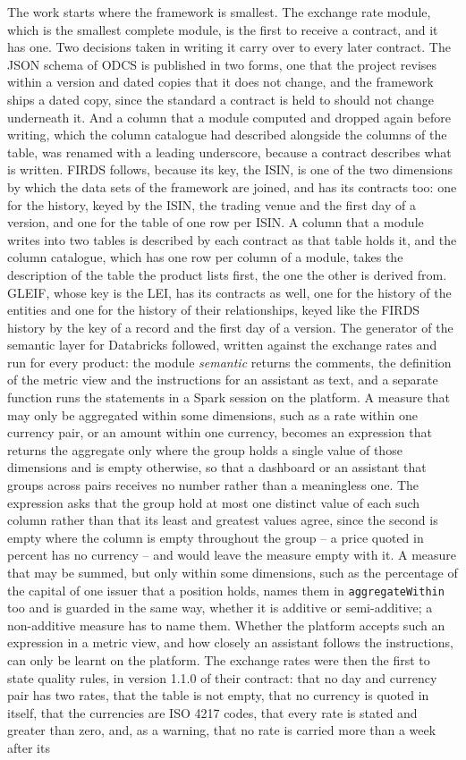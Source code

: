 \documentclass[a4paper, 11pt]{report}
\begin{document}
The work starts where the framework is smallest. The exchange rate module, which is the smallest complete module, is the first to receive a contract, and it has one. Two decisions taken in writing it carry over to every later contract. The JSON schema of ODCS is published in two forms, one that the project revises within a version and dated copies that it does not change, and the framework ships a dated copy, since the standard a contract is held to should not change underneath it. And a column that a module computed and dropped again before writing, which the column catalogue had described alongside the columns of the table, was renamed with a leading underscore, because a contract describes what is written. FIRDS follows, because its key, the ISIN, is one of the two dimensions by which the data sets of the framework are joined, and has its contracts too: one for the history, keyed by the ISIN, the trading venue and the first day of a version, and one for the table of one row per ISIN. A column that a module writes into two tables is described by each contract as that table holds it, and the column catalogue, which has one row per column of a module, takes the description of the table the product lists first, the one the other is derived from. GLEIF, whose key is the LEI, has its contracts as well, one for the history of the entities and one for the history of their relationships, keyed like the FIRDS history by the key of a record and the first day of a version. The generator of the semantic layer for Databricks followed, written against the exchange rates and run for every product: the module \emph{semantic} returns the comments, the definition of the metric view and the instructions for an assistant as text, and a separate function runs the statements in a Spark session on the platform. A measure that may only be aggregated within some dimensions, such as a rate within one currency pair, or an amount within one currency, becomes an expression that returns the aggregate only where the group holds a single value of those dimensions and is empty otherwise, so that a dashboard or an assistant that groups across pairs receives no number rather than a meaningless one. The expression asks that the group hold at most one distinct value of each such column rather than that its least and greatest values agree, since the second is empty where the column is empty throughout the group -- a price quoted in percent has no currency -- and would leave the measure empty with it. A measure that may be summed, but only within some dimensions, such as the percentage of the capital of one issuer that a position holds, names them in \verb|aggregateWithin| too and is guarded in the same way, whether it is additive or semi-additive; a non-additive measure has to name them. Whether the platform accepts such an expression in a metric view, and how closely an assistant follows the instructions, can only be learnt on the platform. The exchange rates were then the first to state quality rules, in version 1.1.0 of their contract: that no day and currency pair has two rates, that the table is not empty, that no currency is quoted in itself, that the currencies are ISO 4217 codes, that every rate is stated and greater than zero, and, as a warning, that no rate is carried more than a week after its 
\end{document}
